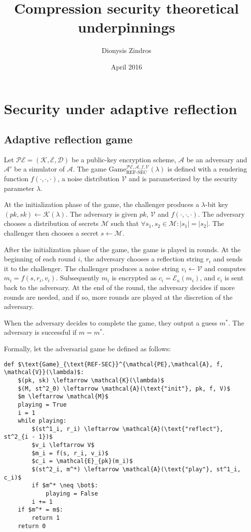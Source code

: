 \documentclass{article}
\title{Compression security theoretical underpinnings}
\author{Dionysis Zindros}
\date{April 2016}
\begin{document}
\maketitle

\section*{Security under adaptive reflection}

\subsection*{Adaptive reflection game}

Let $\mathcal{PE} = (\mathcal{K}, \mathcal{E}, \mathcal{D})$ be a public-key
encryption scheme, $\mathcal{A}$ be an adversary and $\mathcal{A'}$ be a
simulator of $\mathcal{A}$.  The game
$\text{Game}_{\text{REF-SEC}}^{\mathcal{PE},\mathcal{A}, f,
\mathcal{V}}(\lambda)$ is defined with a rendering function $f(\cdot, \cdot,
\cdot)$, a noise distribution $\mathcal{V}$ and is parameterized by the
security parameter $\lambda$.

At the initialization phase of the game, the challenger produces a
$\lambda$-bit key $(pk, sk) \leftarrow \mathcal{K}(\lambda)$. The adversary is
given $pk$, $\mathcal{V}$ and $f(\cdot, \cdot, \cdot)$.  The adversary chooses
a distribution of secrets $\mathcal{M}$ such that $\forall s_1, s_2 \in
\mathcal{M}: |s_1| = |s_2|$.  The challenger then chooses a secret $s
\leftarrow \mathcal{M}$.

After the initialization phase of the game, the game is played in rounds. At
the beginning of each round $i$, the adversary chooses a reflection string
$r_i$ and sends it to the challenger. The challenger produces a noise string
$v_i \leftarrow \mathcal{V}$ and computes $m_i = f(s, r_i, v_i)$.  Subsequently
$m_i$ is encrypted as $c_i = \mathcal{E}_\kappa(m_i)$, and $c_i$ is sent back
to the adversary. At the end of the round, the adversary  decides if more
rounds are needed, and if so, more rounds are played at the discretion of the
adversary.

When the adversary decides to complete the game, they output a guess $m^*$. The
adversary is successful if $m = m^*$.

Formally, let the adversarial game be defined as follows:

\begin{lstlisting}[texcl,mathescape]
def $\text{Game}_{\text{REF-SEC}}^{\mathcal{PE},\mathcal{A}, f,
\mathcal{V}}(\lambda)$:
    $(pk, sk) \leftarrow \mathcal{K}(\lambda)$
    $(M, st^2_0) \leftarrow \mathcal{A}(\text{"init"}, pk, f, V)$
    $m \leftarrow \mathcal{M}$
    playing = True
    i = 1
    while playing:
        $(st^1_i, r_i) \leftarrow \mathcal{A}(\text{"reflect"}, st^2_{i - 1})$
        $v_i \leftarrow V$
        $m_i = f(s, r_i, v_i)$
        $c_i = \mathcal{E}_{pk}(m_i)$
        $(st^2_i, m^*) \leftarrow \mathcal{A}(\text{"play"}, st^1_i, c_i)$
        if $m^* \neq \bot$:
            playing = False
        i += 1
    if $m^* = m$:
        return 1
    return 0
\end{lstlisting}
\end{document}
